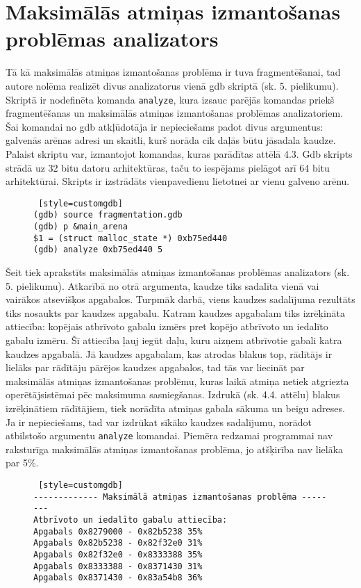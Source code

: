 \section{Maksimālās atmiņas izmantošanas problēmas analizators}
Tā kā maksimālās atmiņas izmantošanas problēma ir tuva fragmentēšanai, tad autore nolēma realizēt divus analizatorus vienā gdb skriptā (sk. 5. pielikumu).
Skriptā ir nodefinēta komanda \texttt{analyze}, kura izsauc parējās komandas priekš fragmentēšanas un maksimālās atmiņas izmantošanas problēmas analizatoriem.
Šai komandai no gdb atkļūdotāja ir nepieciešams padot divus argumentus: galvenās arēnas adresi un skaitli, kurš norāda cik daļās būtu jāsadala kaudze.
Palaist skriptu var, izmantojot komandas, kuras parādītas attēlā 4.3.
Gdb skripts strādā uz 32 bitu datoru arhitektūras, taču to iespējams pielāgot arī 64 bitu arhitektūrai.
Skripts ir izstrādāts vienpavedienu lietotnei ar vienu galveno arēnu.

\begin{figure}[h]
\begin{lstlisting} [style=customgdb]
(gdb) source fragmentation.gdb
(gdb) p &main_arena
$1 = (struct malloc_state *) 0xb75ed440
(gdb) analyze 0xb75ed440 5
\end{lstlisting}
\caption{\textbf{\fontsize{11}{12}\selectfont {Gdb skripta palaišana}}}
\end{figure} %


Šeit tiek aprakstīts maksimālās atmiņas izmantošanas problēmas analizators (sk. 5. pielikumu).
Atkarībā no otrā argumenta, kaudze tiks sadalīta vienā vai vairākos atsevišķos apgabalos.
Turpmāk darbā, viens kaudzes sadalījuma rezultāts tiks nosaukts par kaudzes apgabalu.
Katram kaudzes apgabalam tiks izrēķināta attiecība: kopējais atbrīvoto gabalu izmērs pret kopējo atbrīvoto un iedalīto gabalu izmēru.
Šī attiecība ļauj iegūt daļu, kuru aizņem atbrīvotie gabali katra kaudzes apgabalā.
Jā kaudzes apgabalam, kas atrodas blakus top, rādītājs ir lielāks par rādītāju pārējos kaudzes apgabalos, tad tās var liecināt par maksimālās atmiņas izmantošanas problēmu, kuras laikā atmiņa netiek atgriezta operētājsistēmai pēc maksimuma sasniegšanas.
Izdrukā (sk. 4.4. attēlu) blakus izrēķinātiem rādītājiem, tiek norādīta atmiņas gabala sākuma un beigu adreses.
Ja ir nepieciešams, tad var izdrūkat sīkāko kaudzes sadalījumu, norādot atbilstošo argumentu \texttt{analyze} komandai.
Piemēra redzamai programmai nav raksturīga maksimālās atmiņas izmantošanas problēma, jo atšķirība nav lielāka par 5\%.

\begin{figure}[h]
\begin{lstlisting} [style=customgdb]
------------- Maksimālā atmiņas izmantošanas problēma --------
Atbrīvoto un iedalīto gabalu attiecība:
Apgabals 0x8279000 - 0x82b5238 35%
Apgabals 0x82b5238 - 0x82f32e0 31%
Apgabals 0x82f32e0 - 0x8333388 35%
Apgabals 0x8333388 - 0x8371430 31%
Apgabals 0x8371430 - 0x83a54b8 36%
\end{lstlisting}
\caption{\textbf{\fontsize{11}{12}\selectfont {Maksimālā atmiņas izmantošanas rādītājs}}}
\end{figure}


